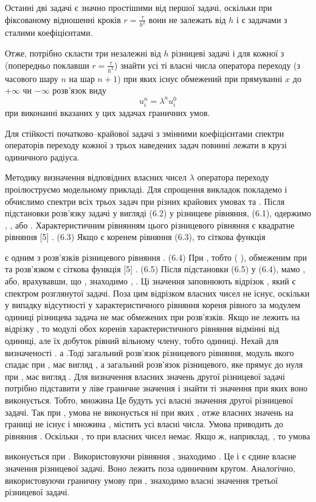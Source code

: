 Останні дві задачі є значно простішими від першої задачі, оскільки при фіксованому відношенні кроків $r = \frac{\tau}{h^2}$ вони не залежать від $h$ і є задачами з сталими коефіцієнтами. \medskip

Отже, потрібно скласти три незалежні від $h$ різницеві задачі і для кожної з (попередньо поклавши $r = \frac{\tau}{h^2}$) знайти усі ті власні числа оператора переходу (з часового шару $n$ на шар $n+1$) при яких існує обмежений при прямуванні $x$ до $+ \infty$ чи $- \infty$ розв'язок виду
\begin{equation}
    \label{eq:6.2}
    u_i^n = \lambda^n u_i^0
\end{equation}
при виконанні вказаних у цих задачах граничних умов.

\begin{proposition}
    Для стійкості початково–крайової задачі з змінними коефіцієнтами спектри операторів переходу кожної з трьох наведених задач повинні лежати в крузі одиничного радіуса.
\end{proposition}

Методику визначення відповідних власних чисел  $\lambda$ оператора переходу проілюструємо модельному прикладі. Для спрощення викладок покладемо   і обчислимо спектри всіх трьох задач при різних крайових умовах   та  .
	Після підстановки розв'язку задачі у вигляді (6.2) у різницеве рівняння, (6.1), одержимо
 ,    ,
або
 .
	Характеристичним рівнянням цього різницевого рівняння є квадратне рівняння [5]
	 .	(6.3)
	Якщо   є коренем рівняння (6.3), то сіткова функція 
 
є одним з розв'язків різницевого рівняння
	 .	(6.4)
	При  , тобто   ( ), обмеженим при   та   розв'язком є сіткова функція [5]
	 .	(6.5)
Після підстановки (6.5) у (6.4), мамо
 ,
або, врахувавши, що  , знаходимо
 ,   .
Ці значення   заповнюють відрізок  , який є спектром розглянутої задачі. Поза цим відрізком власних чисел не існує, оскільки у випадку відсутності у характеристичного рівняння кореня   рівного за модулем одиниці різницева задача не має обмежених при   розв'язків.
	Якщо   не лежить на відрізку  , то модулі обох коренів характеристичного рівняння відмінні від одиниці, але їх добуток рівний вільному члену, тобто одиниці. 
	Нехай для визначеності  . а  .Тоді загальний розв'язок різницевого рівняння, модуль якого спадає при  , має вигляд
 ,
а загальний розв'язок різницевого, яке прямує до нуля при  , має вигляд
 .
	Для визначення власних значень другої різницевої задачі потрібно підставити   у ліве граничне значення   і знайти ті значення   при яких воно виконується. Тобто, множина Це будуть усі власні значення другої різницевої задачі. 
	Так при  , умова   не виконується ні при яких  , отже власних значень на границі не існує і множина  ,   містить усі власні числа.
	Умова   приводить до рівняння
 .
Оскільки  , то при   власних чисел немає.
	Якщо ж, наприклад,  , то умова 
 
 виконується при  . Використовуючи рівняння
 ,
знаходимо
 .
Це і є єдине власне значення різницевої задачі. Воно лежить поза одиничним кругом.
	Аналогічно, використовуючи граничну умову
  при  ,
знаходимо власні значення третьої різницевої задачі.
